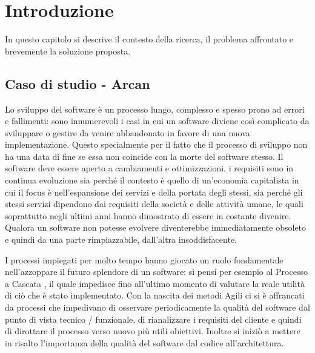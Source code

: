 \chapter{Introduzione}

In questo capitolo si descrive il contesto della ricerca, il problema affrontato e brevemente la soluzione proposta.

\section{Caso di studio - Arcan}


Lo sviluppo del software \`e un processo lungo, complesso e spesso prono ad errori e fallimenti: sono innumerevoli i casi in cui un software diviene cos\`i complicato da sviluppare o gestire da venire abbandonato in favore di una nuova implementazione. Questo specialmente per il fatto che il processo di sviluppo non ha una data di fine se essa non coincide con la morte del software stesso. Il software deve essere aperto a cambiamenti e ottimizzazioni, i requisiti sono in continua evoluzione sia perch\'e il contesto \`e quello di un'economia capitalista in cui il focus \`e nell'espansione dei servizi e della portata degli stessi, sia perch\'e gli stessi servizi dipendono dai requisiti della societ\`a e delle attivit\`a umane, le quali soprattutto negli ultimi anni hanno dimostrato di essere in costante divenire. Qualora un software non potesse evolvere diventerebbe immediatamente obsoleto e quindi da una parte rimpiazzabile, dall'altra insoddisfacente.


I processi impiegati per molto tempo hanno giocato un ruolo fondamentale nell'azzoppare il futuro splendore di un software: si pensi per esempio al Processo a Cascata \cite{larman2002applying}, il quale impedisce fino all'ultimo momento di valutare la reale utilit\`a di ci\`o che \`e stato implementato. Con la nascita dei metodi Agili \cite{larman2002applying} ci si \`e affrancati da processi che impedivano di osservare periodicamente la qualit\`a del software dal punto di vista tecnico / funzionale, di rianalizzare i requisiti del cliente e quindi di dirottare il processo verso nuovo pi\`u utili obiettivi. Inoltre si inizi\`o a mettere in risalto l'importanza della qualit\`a del software dal codice all'architettura.

